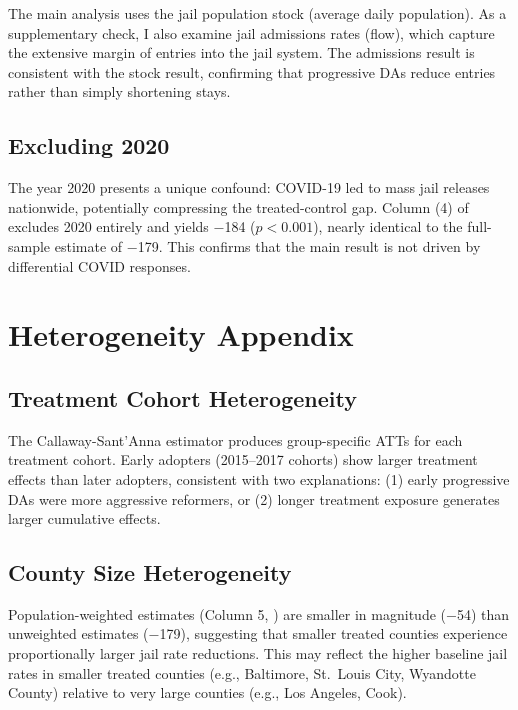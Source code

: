 \documentclass[12pt]{article}
\begin{document}
The main analysis uses the jail population stock (average daily population). As a supplementary check, I also examine jail admissions rates (flow), which capture the extensive margin of entries into the jail system. The admissions result is consistent with the stock result, confirming that progressive DAs reduce entries rather than simply shortening stays.

\subsection{Excluding 2020}

The year 2020 presents a unique confound: COVID-19 led to mass jail releases nationwide, potentially compressing the treated-control gap. Column (4) of  excludes 2020 entirely and yields $-$184 ($p < 0.001$), nearly identical to the full-sample estimate of $-$179. This confirms that the main result is not driven by differential COVID responses.

\section{Heterogeneity Appendix}

\subsection{Treatment Cohort Heterogeneity}

The Callaway-Sant'Anna estimator produces group-specific ATTs for each treatment cohort. Early adopters (2015--2017 cohorts) show larger treatment effects than later adopters, consistent with two explanations: (1) early progressive DAs were more aggressive reformers, or (2) longer treatment exposure generates larger cumulative effects.

\subsection{County Size Heterogeneity}

Population-weighted estimates (Column 5, ) are smaller in magnitude ($-$54) than unweighted estimates ($-$179), suggesting that smaller treated counties experience proportionally larger jail rate reductions. This may reflect the higher baseline jail rates in smaller treated counties (e.g., Baltimore, St.\ Louis City, Wyandotte County) relative to very large counties (e.g., Los Angeles, Cook).
\end{document}
